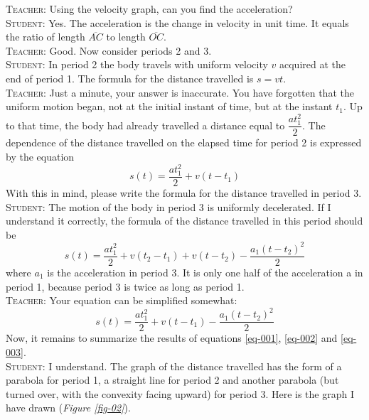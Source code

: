 \documentclass[a4paper,sfsidenotes]{tufte-book}
\begin{document}
\textsc{Teacher:} Using the velocity graph, can you find the acceleration?\\
\textsc{Student:} Yes. The acceleration is the change in velocity in unit time. It equals the ratio of length $\overline{AC}$ to length $\overline{OC}$.\\
\textsc{Teacher:} Good. Now consider periods 2 and 3.\\
\textsc{Student:} In period 2 the body travels with uniform velocity $v$ acquired at the end of period 1. The formula for the distance travelled is $s=vt$.\\
\textsc{Teacher:} Just a minute, your answer is inaccurate. You have forgotten that the uniform motion began, not at the initial instant of time, but at the instant $t_{1}$. Up to that time, the body had already travelled a distance equal to $\dfrac{at_{1}^{2}}{2}$. The
dependence of the distance travelled on the elapsed time for
period 2 is expressed by the equation
\begin{equation}%
s(t) = \frac{at_{1}^{2}}{2}+ v (t-t_{1})
\label{eq-002}
\end{equation}
With this in mind, please write the formula for the distance travelled in period 3.\\
\textsc{Student:} The motion of the body in period 3 is uniformly decelerated. If I understand it correctly, the formula of the distance travelled in this period should be
$$
s(t) = \frac{at_{1}^{2}}{2}+ v (t_{2}-t_{1}) +  v(t-t_{2}) - \frac{a_{1}(t-t_{2})^2}{2}
$$
where $a_{1}$ is the acceleration in period 3. It is only one half of the acceleration a in period 1, because period 3 is twice as long as period 1.\\
\textsc{Teacher:} Your equation can be simplified somewhat:
\begin{equation}%
s(t) = \frac{at_{1}^{2}}{2}+ v (t-t_{1}) - \frac{a_{1}(t-t_{2})^2}{2}
\label{eq-003}
\end{equation}
Now, it remains to summarize the results of equations \ref{eq-001}, \ref{eq-002} and \ref{eq-003}.\\
\textsc{Student:} I understand. The graph of the distance travelled
has the form of a parabola for period 1, a straight line for period 2 and another parabola
(but turned over, with the convexity facing upward) for period 3. Here is the graph I have drawn (\emph{Figure \ref{fig-02}}).\\
\end{document}
